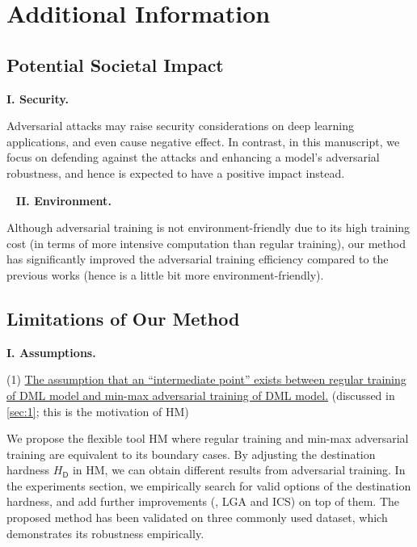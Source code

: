 \clearpage
\appendix

\tableofcontents

\section{Additional Information}
\label{sec:a}

\subsection{Potential Societal Impact}
\label{sec:a1}

\noindent\textbf{I. Security.}

Adversarial attacks may raise security considerations on
deep learning applications, and even cause negative effect.
%
In contrast, in this manuscript, we focus on defending against the attacks and
enhancing a model's adversarial robustness, and hence is expected to have a
positive impact instead.

~\newline
\noindent\textbf{II. Environment.}

Although adversarial training is not
environment-friendly due to its high training cost (in terms of more intensive
computation than regular training), our method has significantly improved the
adversarial training efficiency compared to the previous works (hence is a
little bit more environment-friendly).

\subsection{Limitations of Our Method}
\label{sec:a2}

\noindent\textbf{I. Assumptions.}

(1) \ul{The assumption that an ``intermediate point'' exists between regular
training of DML model and min-max adversarial training of DML model.}
(discussed in \cref{sec:1}; this is the motivation of HM)

We propose the flexible tool HM where regular training and min-max adversarial
training are equivalent to its boundary cases.
%
By adjusting the destination hardness $H_\mathsf{D}$ in HM, we can obtain
different results from adversarial training.
%
In the experiments section, we empirically search for valid options of the
destination hardness, and add further improvements (\ie, LGA and ICS) on top of
them.
%
The proposed method has been validated on three commonly used dataset, which
demonstrates its robustness empirically.

